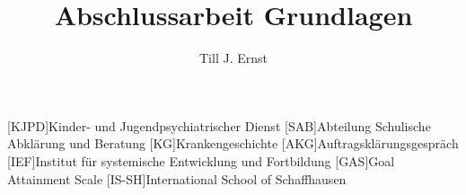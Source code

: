 


\title{Abschlussarbeit Grundlagen}
\author{Till J. Ernst}






\tableofcontents
\newpage

\begin{acronym}[KJPD]
[KJPD]{Kinder- und Jugendpsychiatrischer Dienst}
[SAB]{Abteilung Schulische Abklärung und Beratung}
[KG]{Krankengeschichte}
[AKG]{Auftragsklärungsgespräch}
[IEF]{Institut für systemische Entwicklung und Fortbildung}
[GAS]{Goal Attainment Scale}
[IS-SH]{International School of Schaffhausen}
\end{acronym}
\newpage














\newpage
\begin{flushleft}
{}
\end{flushleft}


%
%
%